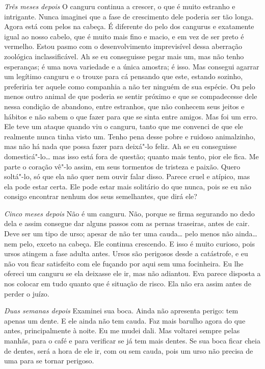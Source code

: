 \textit{Três meses depois}  O canguru continua a crescer, o que é muito estranho e
intrigante. Nunca imaginei que a fase de crescimento dele poderia ser tão longa.
Agora está com pelos na cabeça. É diferente do pelo dos cangurus e exatamente
igual ao nosso cabelo, que é muito mais fino e macio, e em vez de ser preto é
vermelho. Estou pasmo com o desenvolvimento imprevisível dessa
aberração zoológica inclassificável. Ah se eu conseguisse pegar mais um, mas
não tenho esperanças; é uma nova variedade e a única amostra; é isso. Mas
consegui agarrar um legítimo canguru e o trouxe para cá pensando que este,
estando sozinho, preferiria ter aquele como companhia a não ter ninguém de sua
espécie. Ou pelo menos outro animal de que poderia se sentir próximo e que se
compadecesse dele nessa condição de abandono, entre estranhos, que não conhecem
seus jeitos e hábitos e não sabem o que fazer para que se sinta entre amigos.
Mas foi um erro. Ele teve um ataque quando viu o canguru, tanto que me
convenci de que ele realmente nunca tinha visto um. Tenho pena desse pobre e
ruidoso animalzinho, mas não há nada que possa fazer para deixá"-lo feliz. Ah se
eu conseguisse domesticá"-lo\ldots{} mas isso está fora de questão; quanto mais tento,
pior ele fica. Me parte o coração vê"-lo assim, em seus tormentos de tristeza e
paixão. Quero soltá"-lo, só que ela não quer nem ouvir falar disso. Parece cruel e
atípico, mas ela pode estar certa. Ele pode estar mais solitário do
que nunca, pois se eu não consigo encontrar nenhum dos seus semelhantes, que dirá ele?

\textit{Cinco meses depois}   Não é um canguru. Não, porque se firma segurando
no dedo dela  e assim consegue dar alguns passos com as pernas traseiras, antes
de cair. Deve ser um tipo de urso; apesar de não ter uma cauda\ldots{} pelo menos não
ainda\ldots{} nem pelo, exceto na cabeça. Ele continua crescendo. E isso é muito curioso, 
pois ursos atingem a fase adulta antes.
Ursos são perigosos desde a catástrofe, e eu não vou ficar satisfeito com
ele fuçando por aqui sem uma focinheira. Eu lhe ofereci um canguru se ela
deixasse ele ir, mas não adiantou. Eva parece disposta a nos colocar em
tudo quanto que é situação de risco. Ela não era assim antes de perder o juízo.

\textit{Duas semanas depois}   Examinei sua boca. Ainda não apresenta perigo: tem apenas
um dente. E ele ainda não tem cauda. Faz mais barulho agora do que antes,
principalmente à noite. Eu me mudei dali. Mas voltarei sempre pelas manhãs, para o
café e para verificar se já tem mais dentes. Se sua boca ficar
cheia de dentes, será a hora de ele ir, com ou sem cauda, pois um urso não
precisa de uma para se tornar perigoso.

